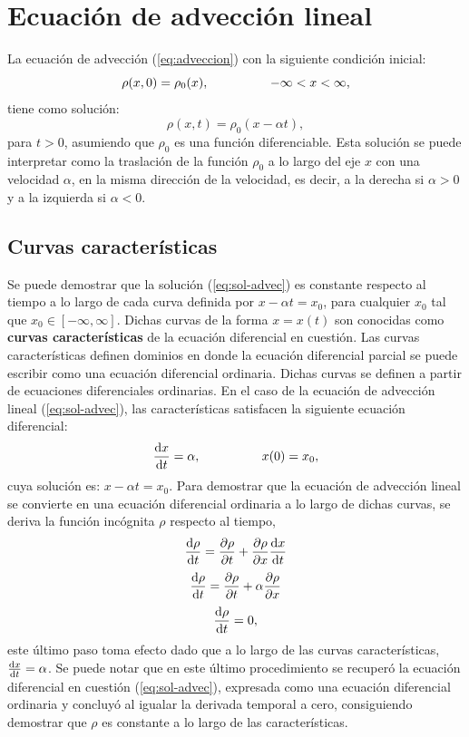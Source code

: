 \section{Ecuación de advección lineal}
La ecuación de advección (\ref{eq:adveccion}) con la siguiente condición inicial:
\begin{equation}
	\rho(x,0) = \rho_0(x), \hspace{1.7cm} -\infty < x < \infty,
\end{equation}
tiene como solución:
\begin{equation}
	\rho(x,t) = \rho_0(x - \alpha t),
	\label{eq:sol-advec}
\end{equation}
para $t> 0$, asumiendo que $\rho_0$ es una función diferenciable. Esta solución se puede interpretar como la traslación de la función $\rho_0$ a lo largo del eje $x$ con una velocidad $\alpha$, en la misma dirección de la velocidad, es decir, a la derecha si $\alpha > 0$ y a la izquierda si $\alpha < 0$.
\subsection{Curvas características}
Se puede demostrar que la solución (\ref{eq:sol-advec}) es constante respecto al tiempo a lo largo de cada curva definida por $x-\alpha t = x_0$, para cualquier $x_0$ tal que $x_0 \in [-\infty, \infty]$. Dichas curvas de la forma $x=x(t)$ son conocidas como \textbf{curvas características} de la ecuación diferencial en cuestión. Las curvas características definen dominios en donde la ecuación diferencial parcial se puede escribir como una ecuación diferencial ordinaria. Dichas curvas se definen a partir de ecuaciones diferenciales ordinarias. En el caso de la ecuación de advección lineal (\ref{eq:sol-advec}), las características satisfacen la siguiente ecuación diferencial:
\begin{equation}
	\dv{x}{t} = \alpha, \hspace{1.7cm} x(0) = x_0,
\end{equation}
cuya solución es: $x-\alpha t = x_0$. Para demostrar que la ecuación de advección lineal se convierte en una ecuación diferencial ordinaria a lo largo de dichas curvas, se deriva la función incógnita $\rho$ respecto al tiempo,
\begin{equation}
	\dv{\rho}{t} = \pdv{\rho}{t} + \pdv{\rho}{x}\dv{x}{t}
\end{equation}
\begin{equation}
	\dv{\rho}{t} = \pdv{\rho}{t} + \alpha\pdv{\rho}{x}
\end{equation}
\begin{equation}
	\dv{\rho}{t} = 0,
\end{equation}
este último paso toma efecto dado que a lo largo de las curvas características, $\dv{x}{t} = \alpha$. Se puede notar que en este último procedimiento se recuperó la ecuación diferencial en cuestión (\ref{eq:sol-advec}), expresada como una ecuación diferencial ordinaria y concluyó al igualar la derivada temporal a cero, consiguiendo demostrar que $\rho$ es constante a lo largo de las características.

